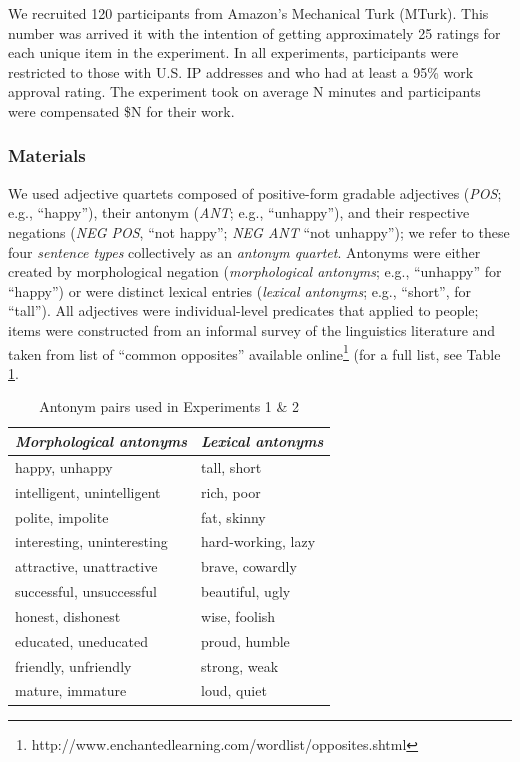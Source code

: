 \documentclass[10pt,letterpaper]{article}
\newcommand{\tableref}[1]{Table \ref{#1}}
\begin{document}
We recruited 120 participants from Amazon's Mechanical Turk (MTurk). 
This number was arrived it with the intention of getting approximately 25 ratings for each unique item in the experiment.
In all experiments, participants were restricted to those with U.S. IP addresses and who had at least a 95\% work approval rating. 
The experiment took on average N minutes and participants were compensated \$N for their work.

\subsubsection{Materials}

We used adjective quartets composed of positive-form gradable adjectives (\emph{POS}; e.g., ``happy''), their antonym (\emph{ANT}; e.g., ``unhappy''), and their respective negations (\emph{NEG POS}, ``not happy''; \emph{NEG ANT} ``not unhappy''); we refer to these four \emph{sentence types} collectively as an \emph{antonym quartet}.
Antonyms were either created by morphological negation (\emph{morphological antonyms}; e.g., ``unhappy'' for ``happy'') or were distinct lexical entries (\emph{lexical antonyms}; e.g., ``short'', for ``tall'').
All adjectives were individual-level predicates that applied to people; items were constructed from an informal survey of the linguistics literature and taken from list of ``common opposites'' available online\footnote{http://www.enchantedlearning.com/wordlist/opposites.shtml} (for a full list, see \tableref{tab:items}.

\begin{table}[b]
\centering
\begin{tabular}{l|l}
\emph{Morphological antonyms}     & \emph{Lexical antonyms}    \\ 
\hline
happy, unhappy             & tall, short         \\
intelligent, unintelligent & rich, poor          \\
polite, impolite           & fat, skinny         \\
interesting, uninteresting & hard-working, lazy  \\
attractive, unattractive   & brave, cowardly     \\
successful, unsuccessful   & beautiful, ugly     \\
honest, dishonest          & wise, foolish       \\
educated, uneducated       & proud, humble       \\
friendly, unfriendly       & strong, weak        \\
mature, immature           & loud, quiet        
\end{tabular}
\caption{Antonym pairs used in Experiments 1 \& 2}
\label{tab:items}
\end{table}
\end{document}
